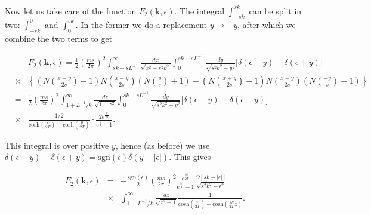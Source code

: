 Now let us take care of the function $F_2(\textbf{k},\epsilon)$. The integral $\int_{-sk}^{sk}$ can be split in two: $\int_{-sk}^{0}$ and $\int_{0}^{sk}$. In the former we do a replacement $y\rightarrow-y$, after which we combine the two terms to get
%
\begin{small}
\begin{eqnarray}
&{}&{}F_2(\textbf{k},\epsilon)=\frac{1}{2}\left(\frac{ms}{2\pi}\right)^2
\int_{sk+sL^{-1}}^\infty \frac{dx}{\sqrt{x^2-s^2k^2}}
\int_{0}^{sk-sL^{-1}} \frac{dy}{\sqrt{s^2k^2-y^2}}
\Bigr[\delta(\epsilon-y)
-
\delta(\epsilon+y)\Bigr] \nonumber
\\
\nonumber
&\times&\left\{(N\left(\frac{x-y}{2s}\right)+1)N\left(\frac{x+y}{2s}\right)(N\left(\frac{y}{s}\right)+1)
-
(N\left(\frac{x+y}{2s}\right)+1)N\left(\frac{x-y}{2s}\right)(N\left(\frac{-y}{s}\right)+1)
\right\}\\
\nonumber
&=&
\frac{1}{2}\left(\frac{ms}{2\pi}\right)^2
\int_{1+L^{-1}/k}^\infty
\frac{dz}{\sqrt{1-z^2}}
\int_{0}^{sk-sL^{-1}}
\frac{dy}{\sqrt{s^2k^2-y^2}}
\Bigr[\delta(\epsilon-y)
-
\delta(\epsilon+y)\Bigr]\\ 
&\times&\frac{1/2}{\mathrm{cosh}\left(\frac{x}{2T}\right)-\mathrm{cosh}\left(\frac{y}{2T}\right)}\cdot\frac{2e^{\frac{y}{2T}}}{e^{\frac{y}{T}}-1}.
\end{eqnarray}
\end{small}
%
This integral is over positive $y$, hence (as before) we use $\delta(\epsilon-y)-\delta(\epsilon+y)=\mathrm{sgn}(\epsilon)\delta(y-|\epsilon|)$. This gives
%
\begin{footnotesize}
\begin{eqnarray}
F_2(\textbf{k},\epsilon)
    &=& - \frac{\mathrm{sgn}(\epsilon)}{2}\left(\frac{ms}{2\pi}\right)^2
\frac{e^{\frac{|\epsilon|}{2T}}}{e^{\frac{|\epsilon|}{T}}-1}
\frac{\Theta[sk-|\epsilon|]}{\sqrt{s^2k^2-\epsilon^2}}\nonumber \\
    &\times&\int_{1+L^{-1}/k}^\infty \frac{dz}{\sqrt{z^2-1}}
\frac{1}{\mathrm{cosh}\left(\frac{|\epsilon|}{2T}\right)-\mathrm{cosh}\left(\frac{sk}{2T}z\right)}.
\end{eqnarray}
\end{footnotesize}
%

